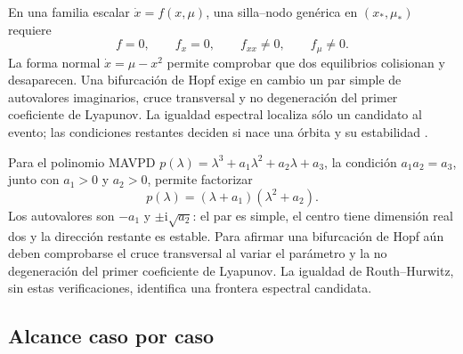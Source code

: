En una familia escalar \(\dot x=f(x,\mu)\), una silla--nodo genérica en
\((x_*,\mu_*)\) requiere
\begin{equation}
 f=0,\qquad f_x=0,\qquad f_{xx}\ne0,\qquad f_\mu\ne0.
 \label{geo:eq:saddle-node-conditions}
\end{equation}
La forma normal \(\dot x=\mu-x^2\) permite comprobar que dos equilibrios
colisionan y desaparecen. Una bifurcación de Hopf exige en cambio un par simple
de autovalores imaginarios, cruce transversal y no degeneración del primer
coeficiente de Lyapunov. La igualdad espectral localiza sólo un candidato al
evento; las condiciones restantes deciden si nace una órbita y su estabilidad
\cite{Kuznetsov2023Bifurcation,JaurezEtAl2021TGEDII}.

Para el polinomio MAVPD
\(p(\lambda)=\lambda^3+a_1\lambda^2+a_2\lambda+a_3\), la condición
\(a_1a_2=a_3\), junto con \(a_1>0\) y \(a_2>0\), permite factorizar
\[
 p(\lambda)=(\lambda+a_1)(\lambda^2+a_2).
\]
Los autovalores son \(-a_1\) y \(\pm\mathrm i\sqrt{a_2}\): el par
es simple, el centro tiene dimensión real dos y la dirección restante es
estable. Para afirmar una bifurcación de Hopf aún deben comprobarse el
cruce transversal al variar el parámetro y la no degeneración del primer
coeficiente de Lyapunov. La igualdad de Routh--Hurwitz, sin estas
verificaciones, identifica una frontera espectral candidata.

\subsection{Alcance caso por caso}

